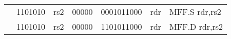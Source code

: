 \begin{table}[p]
\begin{small}
\begin{center}
\begin{tabular}{rcccccccccccl}
&
\multicolumn{2}{|c|}{1101010} &
\multicolumn{1}{c|}{rs2} &
\multicolumn{1}{c|}{00000} &
\multicolumn{6}{c|}{0001011000} &
\multicolumn{1}{c|}{rdr} & MFF.S rdr,rs2 \\
\cline{2-12}
  

&
\multicolumn{2}{|c|}{1101010} &
\multicolumn{1}{c|}{rs2} &
\multicolumn{1}{c|}{00000} &
\multicolumn{6}{c|}{1101011000} &
\multicolumn{1}{c|}{rdr} & MFF.D rdr,rs2 \\
\cline{2-12}
  

\end{tabular}
\end{center}
\end{small}

\label{instr-table}
\end{table}
  

\newpage

